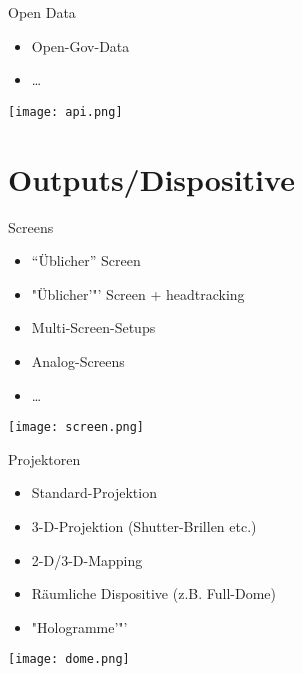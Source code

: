 \begin{frame}{Open Data}
\begin{itemize}
	\item Open-Gov-Data
	\item \dots{}

\end{itemize}
\begin{center}
\texttt{[image: api.png]}
\end{center}

\end{frame}


\section{Outputs/Dispositive}
 \frame{\sectionpage}

\begin{frame}{Screens}

\begin{itemize}
	\item "`Üblicher"' Screen
	\item "Üblicher'"' Screen + headtracking
	\item Multi-Screen-Setups
	\item Analog-Screens
	\item \dots{}

\end{itemize}

\begin{center}
\texttt{[image: screen.png]}
\end{center}




\end{frame}


\begin{frame}{Projektoren}
\begin{itemize}
	\item Standard-Projektion
	\item 3-D-Projektion (Shutter-Brillen etc.)
	\item 2-D/3-D-Mapping
	\item Räumliche Dispositive (z.B. Full-Dome)
	\item "Hologramme'"'
\end{itemize}

\begin{center}
\texttt{[image: dome.png]}
\end{center}
\end{frame}


